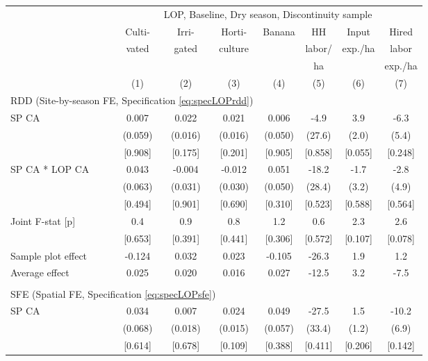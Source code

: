 \begin{tabular}{lccccccc}
\hline \hline
 & \multicolumn{7}{c}{LOP, Baseline, Dry season, Discontinuity sample} \\
\cmidrule(lr){2-8}
 & Culti- & Irri- & Horti- & Banana & HH & Input & Hired \\
 & vated & gated & culture & & labor/ & exp./ha & labor \\
 & & & & & ha & & exp./ha \\
\cmidrule(lr){2-2}\cmidrule(lr){3-3}\cmidrule(lr){4-4}\cmidrule(lr){5-5}\cmidrule(lr){6-6}\cmidrule(lr){7-7}\cmidrule(lr){8-8}
 & (1) & (2) & (3) & (4) & (5) & (6) & (7) \\
\hline
\multicolumn{4}{l}{RDD (Site-by-season FE, Specification \ref{eq:specLOPrdd})} & & & & \\
\cmidrule(lr){1-4}
SP CA & 0.007 & 0.022 & 0.021 & 0.006 & -4.9\hphantom{-} & 3.9 & -6.3\hphantom{-} \\
 & (0.059) & (0.016) & (0.016) & (0.050) & (27.6) & (2.0) & (5.4) \\
 & [0.908] & [0.175] & [0.201] & [0.905] & [0.858] & [0.055] & [0.248] \\
SP CA * LOP CA & 0.043 & -0.004\hphantom{-} & -0.012\hphantom{-} & 0.051 & -18.2\hphantom{-} & -1.7\hphantom{-} & -2.8\hphantom{-} \\
 & (0.063) & (0.031) & (0.030) & (0.050) & (28.4) & (3.2) & (4.9) \\
 & [0.494] & [0.901] & [0.690] & [0.310] & [0.523] & [0.588] & [0.564] \\
Joint F-stat [p] & 0.4 & 0.9 & 0.8 & 1.2 & 0.6 & 2.3 & 2.6 \\
 & [0.653] & [0.391] & [0.441] & [0.306] & [0.572] & [0.107] & [0.078] \\
\cmidrule(lr){1-8}
Sample plot effect & -0.124 & 0.032 & 0.023 & -0.105 & -26.3 & 1.9 & 1.2 \\
Average effect & 0.025 & 0.020 & 0.016 & 0.027 & -12.5 & 3.2 & -7.5 \\
\cmidrule(lr){1-8}
\\[-0.5em]
\multicolumn{4}{l}{SFE (Spatial FE, Specification \ref{eq:specLOPsfe})} & & & & \\
\cmidrule(lr){1-4}
SP CA & 0.034 & 0.007 & 0.024 & 0.049 & -27.5\hphantom{-} & 1.5 & -10.2\hphantom{-} \\
 & (0.068) & (0.018) & (0.015) & (0.057) & (33.4) & (1.2) & (6.9) \\
 & [0.614] & [0.678] & [0.109] & [0.388] & [0.411] & [0.206] & [0.142] \\

\end{tabular}
